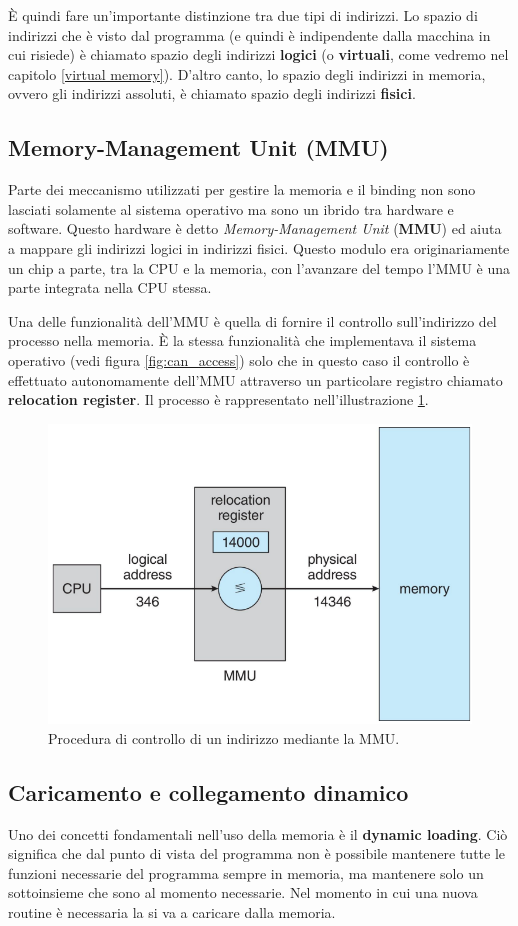 È quindi fare un'importante distinzione tra due tipi di indirizzi. Lo spazio di indirizzi che è visto dal programma (e quindi è indipendente dalla macchina in cui risiede) è chiamato spazio degli indirizzi \textbf{logici} (o \textbf{virtuali}, come vedremo nel capitolo \ref{virtual memory}). D'altro canto, lo spazio degli indirizzi in memoria, ovvero gli indirizzi assoluti, è chiamato spazio degli indirizzi \textbf{fisici}. 

% 
\subsection{Memory-Management Unit (MMU)}
Parte dei meccanismo utilizzati per gestire la memoria e il binding non sono lasciati solamente al sistema operativo ma sono un ibrido tra hardware e software. Questo hardware è detto \textit{Memory-Management Unit} (\textbf{MMU}) ed aiuta a mappare gli indirizzi logici in indirizzi fisici. Questo modulo era originariamente un chip a parte, tra la CPU e la memoria, con l'avanzare del tempo l'MMU è una parte integrata nella CPU stessa.

Una delle funzionalità dell'MMU è quella di fornire il controllo sull'indirizzo del processo nella memoria. È la stessa funzionalità che implementava il sistema operativo (vedi figura \ref{fig:can_access}) solo che in questo caso il controllo è effettuato autonomamente dell'MMU attraverso un particolare registro chiamato \textbf{relocation register}. Il processo è rappresentato nell'illustrazione \ref{fig:can_access_MMU}.

\begin{figure}[h]
    \centering
    \includegraphics[width = .55\textwidth]{../res/imgs/main memory/can_access_MMU.png}
    \caption{Procedura di controllo di un indirizzo mediante la MMU.}
    \label{fig:can_access_MMU}
\end{figure}

% 
\subsection{Caricamento e collegamento dinamico}\label{dynamic loading and linking}
Uno dei concetti fondamentali nell'uso della memoria è il \textbf{dynamic loading}. Ciò significa che dal punto di vista del programma non è possibile mantenere tutte le funzioni necessarie del programma sempre in memoria, ma mantenere solo un sottoinsieme che sono al momento necessarie. Nel momento in cui una nuova routine è necessaria la si va a caricare dalla memoria.

